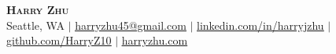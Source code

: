 \pagestyle{fancy}
\fancyhf{} %
\fancyfoot{}
\renewcommand{\headrulewidth}{0pt}
\renewcommand{\footrulewidth}{0pt}

\begin{center}
    \textbf{\Huge\scshape Harry Zhu} \\ \vspace{1pt}
    Seattle, WA 
    $|$ \href{mailto:harryzhu45@gmail.com}{\underline{harryzhu45@gmail.com}}
    $|$ \href{https://linkedin.com/in/harryjzhu}{\underline{linkedin.com/in/harryjzhu}}
    $|$ \href{https://github.com/HarryZ10}{\underline{github.com/HarryZ10}}
    $|$ \href{https://harryzhu.com}{\underline{harryzhu.com}}
\end{center}
